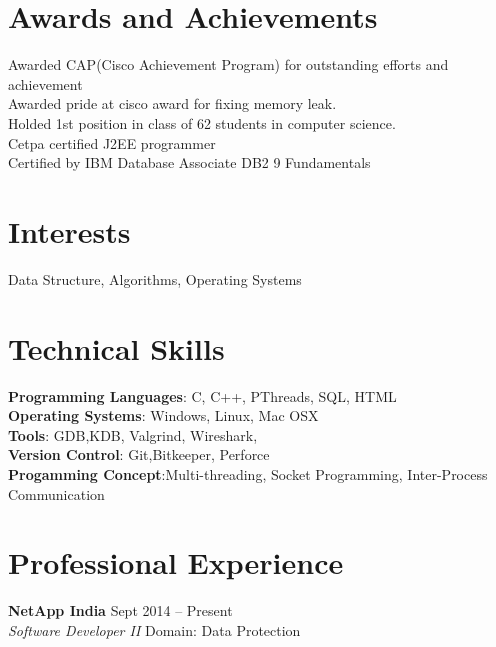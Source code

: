 \documentclass[margin,line]{res}
\begin{document}
\begin{resume}





\section{\sc Awards and Achievements}
Awarded CAP(Cisco Achievement Program) for outstanding efforts and achievement\\
Awarded pride at cisco award for fixing memory leak.\\
Holded 1st position in class of 62 students in computer science.\\
Cetpa certified J2EE programmer\\
Certified by IBM Database Associate DB2 9 Fundamentals\\

\section{\sc Interests}

Data Structure, Algorithms, Operating Systems


\section{\sc Technical Skills}
{\bf Programming Languages}:  C, C++, PThreads,  SQL, HTML \\
{\bf Operating Systems}: Windows, Linux, Mac OSX\\
{\bf Tools}: GDB,KDB, Valgrind, Wireshark,  \\
{\bf  Version Control}: Git,Bitkeeper, Perforce  \\
{\bf Progamming Concept}:Multi-threading, Socket Programming, Inter-Process Communication \\ 



\section{\sc Professional Experience}

{\bf NetApp India}                 \hfill{Sept 2014 -- Present}\\
{\em Software Developer II} \hfill {Domain: Data Protection}\\

\begin{itemize} %
\setlength\itemsep{-1em}


\end{itemize}
\end{resume}
\end{document}
